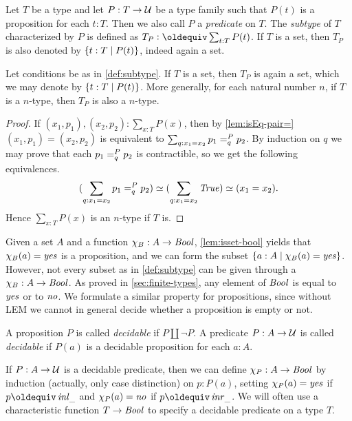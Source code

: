 \begin{definition}\label{def:subtype}
Let $T$ be a type and let $P: T\to\mathcal{U}$ be a type family such that
$P(t)$ is a proposition for each $t:T$. Then we also
call $P$ a \emph{predicate} on $T$.
The \emph{subtype} of $T$ characterized by $P$ is defined 
as $T_P\defeq \sum_{t:T} P(t)$.
If $T$ is a set, then $T_P$
is also denoted by $\{t:T \mid P(t)\}$, indeed again a set.
\end{definition}

\begin{lemma}\label{lem:subtype-same-level}
Let conditions be as in \cref{def:subtype}.
If $T$ is a set, then $T_P$ is again a set, which we may
denote by $\{t:T \mid P(t)\}$. More generally, for each natural number $n$,
if $T$ is a $n$-type, then $T_P$ is also a $n$-type.
\end{lemma}

\begin{proof}
If $(x_1,p_1),(x_2,p_2) : \sum_{x:T} P(x)$, then by \cref{lem:isEq-pair=}
$(x_1,p_1)=(x_2,p_2)$ is equivalent to 
$\sum_{q:x_1=x_2} p_1 =^{P}_{q} p_2$.
By induction on $q$ we may prove that each $p_1 =^{P}_{q} p_2$ is contractible,
so we get the following equivalences.
\[
(\sum_{q:x_1=x_2} p_1 =^{P}_{q} p_2) \simeq 
(\sum_{q:x_1=x_2} \mathop{\mathit{True}}) \simeq (x_1=x_2).
\]
Hence $\sum_{x:T} P(x)$ is an $n$-type if $T$ is.
\end{proof}

Given a set $A$ and a function $\chi_B: A\to\mathop{\mathit{Bool}}$,
\cref{lem:isset-bool} yields that $\chi_B(a) = \mathop{\mathit{yes}}$ is a
proposition, and we can form
the subset $\{a:A \mid \chi_B(a) = \mathop{\mathit{yes}}\}$. However,
not every subset as in \cref{def:subtype} can be given
through a $\chi_B: A\to\mathop{\mathit{Bool}}$. As proved in \cref{sec:finite-types},
any element of $\mathop{\mathit{Bool}}$ is equal to $\mathop{\mathit{yes}}$ or to $\mathop{\mathit{no}}$.
We formulate a similar property for propositions, since without LEM
we cannot in general decide whether a proposition is empty or not.

\begin{definition}\label{def:decidability}
A proposition $P$ is called \emph{decidable} if $P\amalg\neg P$.
A predicate $P: A\to\mathcal{U}$ is called \emph{decidable} if 
$P(a)$ is a decidable proposition for each $a:A$.
\end{definition}

If $P: A\to\mathcal{U}$ is a decidable predicate, then
we can define $\chi_P: A\to\mathop{\mathit{Bool}}$ by induction (actually,
only case distinction) on $p:P(a)$, setting $\chi_P(a)=\mathop{\mathit{yes}}$
if $p\jdeq\inl{\_}$ and $\chi_P(a)=\mathop{\mathit{no}}$ if $p\jdeq\inr{\_}$.
We will often use a characteristic function $T\to\mathop{\mathit{Bool}}$ to
specify a decidable predicate on a type $T$.

